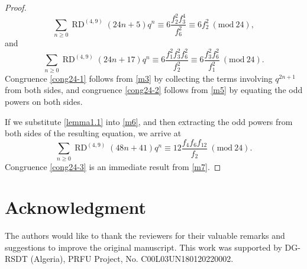 \documentclass[12pt]{amsart}
\DeclareMathOperator {\myRD}{RD}
\theoremstyle{plain}
\theoremstyle{definition}
\begin{document}
\begin{proof}
\begin{equation}
    \sum_{n\geq 0} \myRD^{(4, 9)}(24n+5)q^{n} \equiv 6 \dfrac{f_{2}^{2} f_{3}^{4}}{f_{6}^{2}} \equiv 6 f_{2}^{2} \ (\mathrm{mod} \ 24), \label{m5}
\end{equation}
and
\begin{equation}
    \sum_{n\geq 0} \myRD^{(4, 9)}(24n+17)q^{n} \equiv 6 \dfrac{f_{1}^{2}  f_{3}^{2} f_{6}^{2}}{f_{2}^{2}} \equiv 6 \dfrac{f_{3}^{2} f_{6}^{2}}{f_{1}^{2}} \ (\mathrm{mod} \ 24). \label{m6}
\end{equation}
Congruence \eqref{cong24-1} follows from \eqref{m3} by collecting the terms involving $q^{2n+1}$ from both sides, and congruence \eqref{cong24-2} follows from \eqref{m5} by equating the odd powers on both sides.

If we substitute \eqref{lemma1.1} into \eqref{m6}, and then extracting the odd powers from both sides of the resulting equation, we arrive at
\begin{equation}
    \sum_{n\geq 0} \myRD^{(4, 9)}(48n+41)q^{n} \equiv  12 \dfrac{f_{4} f_{6} f_{12}}{f_{2}} \ (\mathrm{mod} \ 24). \label{m7}
\end{equation}
Congruence \eqref{cong24-3} is an immediate result from \eqref{m7}.
 \end{proof}



\section*{Acknowledgment}
The authors would like to thank the reviewers for their valuable remarks and suggestions to improve the original manuscript. This work was supported by DG-RSDT (Algeria), PRFU Project, No. C00L03UN180120220002. 
\end{document}
